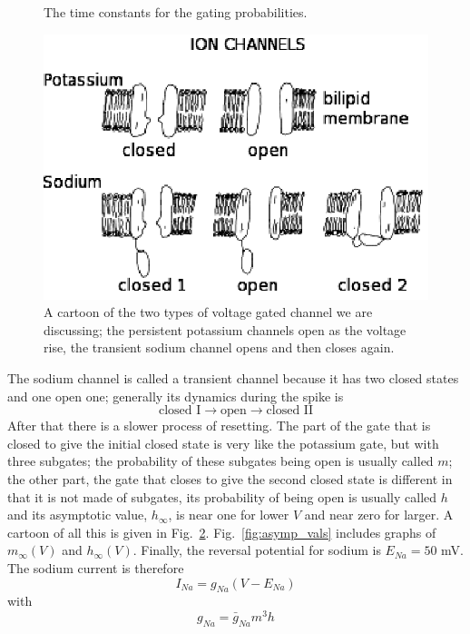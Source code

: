 \documentclass[11pt,a4paper]{scrartcl}
\begin{document}
\begin{figure}
\begin{center}

\end{center}
\caption{The time constants for the gating probabilities.\label{fig:tau_vals}}
\end{figure}


\begin{figure}
\begin{center}
\includegraphics{ChannelsBlack.eps}
\end{center}
\caption{A cartoon of the two types of voltage gated channel we are
  discussing; the persistent potassium channels open as the voltage
  rise, the transient sodium channel opens and then closes
  again.\label{ChannelsBlack}}
\end{figure}



The sodium channel is called a transient channel because it has two
closed states and one open one; generally its dynamics during the
spike is
\begin{equation}
\mbox{closed I}\rightarrow \mbox{open}\rightarrow\mbox{closed II}
\end{equation}
After that there is a slower process of resetting. The part of the
gate that is closed to give the initial closed state is very like the
potassium gate, but with three subgates; the probability of these
subgates being open is usually called $m$; the other part, the gate
that closes to give the second closed state is different in that it is
not made of subgates, its probability of being open is usually called
$h$ and its asymptotic value, $h_\infty$, is near one for lower $V$
and near zero for larger. A cartoon of all this is given in Fig.~\ref{ChannelsBlack}. Fig.~\ref{fig:asymp_vals} includes graphs of $m_\infty(V)$
and $h_\infty(V)$. Finally, the reversal potential for sodium is
$E_{Na}=50$ mV. The sodium current is therefore
\begin{equation}
I_{Na}=g_{Na}(V-E_{Na})
\end{equation}
with
\begin{equation}
g_{Na}=\bar{g}_{Na}m^3h
\end{equation}
\end{document}
